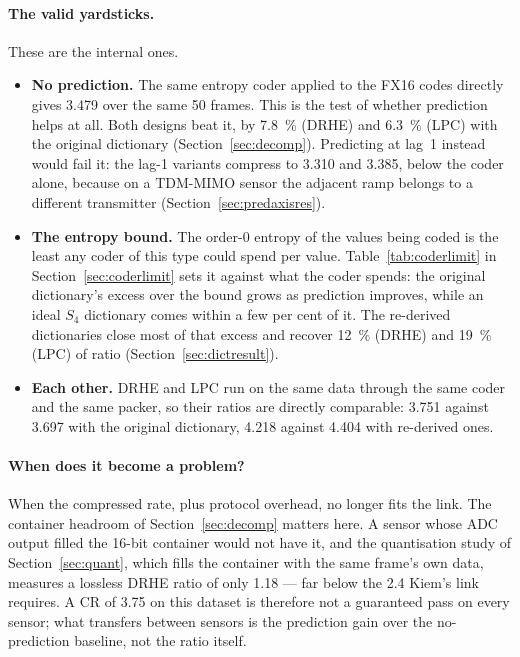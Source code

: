 \paragraph{The valid yardsticks.} These are the internal ones.
\begin{itemize}
\item \textbf{No prediction.} The same entropy coder applied to the FX16 codes
directly gives 3.479 over the same 50 frames. This is the test of whether
prediction helps at all. Both designs beat it, by \SI{7.8}{\percent} (DRHE) and
\SI{6.3}{\percent} (LPC) with the original dictionary
(Section~\ref{sec:decomp}). Predicting at lag~1 instead would fail it: the lag-1
variants compress to 3.310 and 3.385, below the coder alone, because on a
TDM-MIMO sensor the adjacent ramp belongs to a different transmitter
(Section~\ref{sec:predaxisres}).
\item \textbf{The entropy bound.} The order-0 entropy of the values being coded
is the least any coder of this type could spend per value.
Table~\ref{tab:coderlimit} in Section~\ref{sec:coderlimit} sets it against what
the coder spends: the original dictionary's excess over the bound grows as
prediction improves, while an ideal $S_4$ dictionary comes within a few per cent
of it. The re-derived dictionaries close most of that excess and recover
\SI{12}{\percent} (DRHE) and \SI{19}{\percent} (LPC) of ratio
(Section~\ref{sec:dictresult}).
\item \textbf{Each other.} DRHE and LPC run on the same data through the same
coder and the same packer, so their ratios are directly comparable: 3.751
against 3.697 with the original dictionary, 4.218 against 4.404 with re-derived
ones.
\end{itemize}

\paragraph{When does it become a problem?} When the compressed rate, plus
protocol overhead, no longer fits the link. The container headroom of
Section~\ref{sec:decomp} matters here. A sensor whose ADC output filled the
16-bit container would not have it, and the quantisation study of
Section~\ref{sec:quant}, which fills the container with the same frame's own
data, measures a lossless DRHE ratio of only 1.18 --- far below the 2.4 Kiem's
link requires. A CR of 3.75 on
this dataset is therefore not a guaranteed pass on every sensor; what transfers
between sensors is the prediction gain over the no-prediction baseline, not the
ratio itself.

